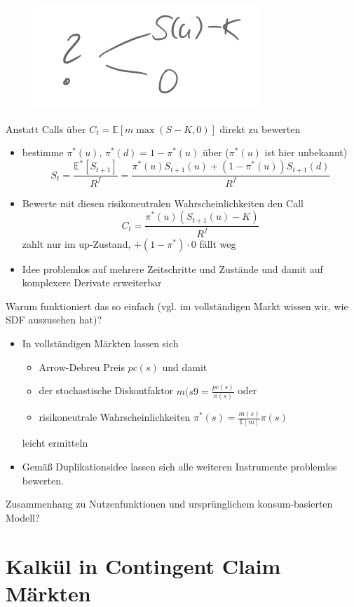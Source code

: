 \documentclass[12pt]{extreport} %
\theoremstyle{named}
\theoremstyle{nnamed}
\theoremstyle{itshape}
\theoremstyle{normal}
\begin{document}
\begin{figure}[h!] \centering
	\includegraphics[scale=0.5]{img/p70}
\end{figure}

Anstatt Calls über $C_t = \mathbb{E}\left[m \max \left( S - K, 0 \right) \right]$ direkt zu bewerten
\begin{itemize}
	\item bestimme $\pi^*(u)$, $\pi^*(d) = 1 - \pi^*(u)$ über ($\pi^*(u)$ ist hier unbekannt)
		$$ S_t = \frac{\mathbb{E}^*[S_{t+1}]}{R^f} = \frac{\pi^*(u) S_{t+1}(u) + (1 - \pi^*(u)) S_{t+1}(d)}{R^f} $$
	\item Bewerte mit diesen risikoneutralen Wahrscheinlichkeiten den Call
		$$ C_t = \frac{\pi^*(u) \left( S_{t+1}(u) - K \right)}{R^f} $$
		zahlt nur im up-Zustand, $+ (1 - \pi^*) \cdot 0$ fällt weg
	\item Idee problemlos auf mehrere Zeitschritte und Zustände und damit auf komplexere Derivate erweiterbar
\end{itemize}

Warum funktioniert das so einfach (vgl. im vollständigen Markt wissen wir, wie SDF auszusehen hat)?
\begin{itemize}
	\item In vollständigen Märkten lassen sich
		\begin{itemize}
			\item Arrow-Debreu Preis $pc(s)$ und damit
			\item der stochastische Diskontfaktor $m(s9 = \frac{pc(s)}{\pi(s)}$ oder
			\item risikoneutrale Wahrscheinlichkeiten $\pi^*(s) = \frac{m(s)}{\mathbb{E}[m]} \pi(s)$
		\end{itemize}
		leicht ermitteln
	\item Gemäß Duplikationsidee lassen sich alle weiteren Instrumente problemlos bewerten.
\end{itemize}

Zusammenhang zu Nutzenfunktionen und ursprünglichem konsum-basierten Modell? 

\section{Kalkül in Contingent Claim Märkten}
\end{document}
